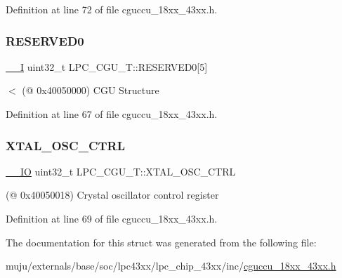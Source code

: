 Definition at line 72 of file cguccu\+\_\+18xx\+\_\+43xx.\+h.

\mbox{\label{struct_l_p_c___c_g_u___t_aebb83c538adc57d68f942881f3e16281}} 
\subsubsection{\texorpdfstring{R\+E\+S\+E\+R\+V\+E\+D0}{RESERVED0}}
{\footnotesize\ttfamily \hyperlink{core__sc300_8h_af63697ed9952cc71e1225efe205f6cd3}{\+\_\+\+\_\+I} uint32\+\_\+t L\+P\+C\+\_\+\+C\+G\+U\+\_\+\+T\+::\+R\+E\+S\+E\+R\+V\+E\+D0\mbox{[}5\mbox{]}}

$<$ (@ 0x40050000) C\+GU Structure 

Definition at line 67 of file cguccu\+\_\+18xx\+\_\+43xx.\+h.

\mbox{\label{struct_l_p_c___c_g_u___t_a8c74683d8e3fd22949ffd896f4d42218}} 
\subsubsection{\texorpdfstring{X\+T\+A\+L\+\_\+\+O\+S\+C\+\_\+\+C\+T\+RL}{XTAL\_OSC\_CTRL}}
{\footnotesize\ttfamily \hyperlink{core__sc300_8h_aec43007d9998a0a0e01faede4133d6be}{\+\_\+\+\_\+\+IO} uint32\+\_\+t L\+P\+C\+\_\+\+C\+G\+U\+\_\+\+T\+::\+X\+T\+A\+L\+\_\+\+O\+S\+C\+\_\+\+C\+T\+RL}

(@ 0x40050018) Crystal oscillator control register 

Definition at line 69 of file cguccu\+\_\+18xx\+\_\+43xx.\+h.



The documentation for this struct was generated from the following file\+:\begin{DoxyCompactItemize}
\item 
muju/externals/base/soc/lpc43xx/lpc\+\_\+chip\+\_\+43xx/inc/\hyperlink{cguccu__18xx__43xx_8h}{cguccu\+\_\+18xx\+\_\+43xx.\+h}\end{DoxyCompactItemize}
